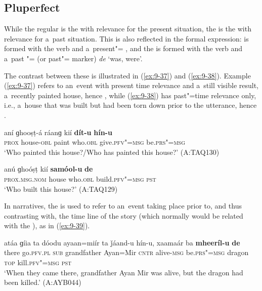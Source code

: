 \subsection{Pluperfect}
\label{subsec:9-1-8}

While the regular  is the  with relevance for the present situation, the  is the  with relevance for a~past situation. This is also reflected in the formal expression:  is formed with the  verb and a~present"= , and the  is formed with the  verb and a~past "= (or past"= marker) \textit{de} `was, were'. 


The contrast between these is illustrated in (\ref{ex:9-37}) and (\ref{ex:9-38}). Example (\ref{ex:9-37}) refers to an~event with present time relevance and a~still visible result, a~recently painted house, hence , while (\ref{ex:9-38}) has past"=time relevance only, i.e., a~house that was built but had been torn down prior to the utterance, hence .

\begin{exe}
\ex
\label{ex:9-37}
\gll aní ɡhooṣṭ-á ráanɡ kií \textbf{dít-u} \textbf{hín-u}  \\
\textsc{prox} house-\textsc{obl} paint who.\textsc{obl} give.\textsc{pfv"=msg} be.\textsc{prs"=msg} \\
\glt `Who painted this house?/Who has painted this house?' (A:TAQ130)

\ex
\label{ex:9-38}
\gll anú ɡhoóṣṭ kií \textbf{samóol-u} \textbf{de} \\
\textsc{prox.msg.nom} house who.\textsc{obl} build.\textsc{pfv"=msg} \textsc{pst} \\
\glt `Who built this house?' (A:TAQ129)
\end{exe}

In narratives, the  is used to refer to an~event taking place prior to, and thus contrasting with, the time line of the story (which normally would be related with the ), as in (\ref{ex:9-39}).

\begin{exe}
\ex
\label{ex:9-39}
\gll atáa ɡíia ta dóodu ayaan=miír ta ǰáand-u hín-u, xaamaár ba \textbf{mheeríl-u} \textbf{de} \\
there go.\textsc{pfv.pl} \textsc{sub} grandfather Ayan=Mir \textsc{cntr}  alive-\textsc{msg}
be.\textsc{prs"=msg} dragon \textsc{top} kill.\textsc{pfv"=msg} \textsc{pst} \\
\glt `When they came there, grandfather Ayan Mir was alive, but the dragon had been killed.' (A:AYB044) 
\end{exe}

